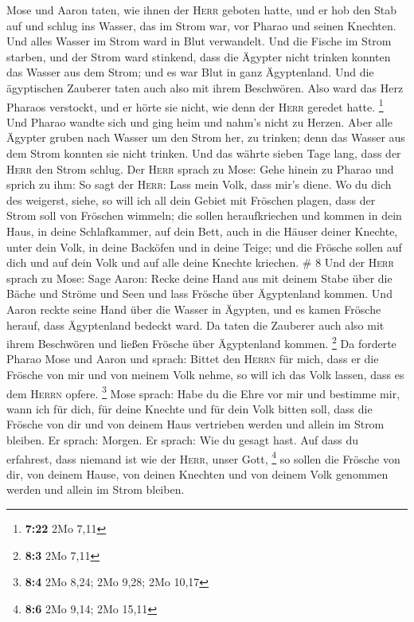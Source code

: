  Mose und Aaron taten, wie ihnen der \textsc{Herr}
geboten hatte, und er hob den Stab auf und schlug ins Wasser, das im
Strom war, vor Pharao und seinen Knechten. Und alles Wasser im Strom
ward in Blut verwandelt.  Und die Fische im Strom
starben, und der Strom ward stinkend, dass die Ägypter nicht trinken
konnten das Wasser aus dem Strom; und es war Blut in ganz Ägyptenland.
 Und die ägyptischen Zauberer taten auch also mit ihrem
Beschwören. Also ward das Herz Pharaos verstockt, und er hörte sie
nicht, wie denn der \textsc{Herr} geredet hatte. \footnote{\textbf{7:22}
  2Mo 7,11}  Und Pharao wandte sich und ging heim und
nahm's nicht zu Herzen.  Aber alle Ägypter gruben nach
Wasser um den Strom her, zu trinken; denn das Wasser aus dem Strom
konnten sie nicht trinken.  Und das währte sieben Tage
lang, dass der \textsc{Herr} den Strom schlug.  Der
\textsc{Herr} sprach zu Mose: Gehe hinein zu Pharao und sprich zu ihm:
So sagt der \textsc{Herr}: Lass mein Volk, dass mir's diene.
 Wo du dich des weigerst, siehe, so will ich all dein
Gebiet mit Fröschen plagen,  dass der Strom soll von
Fröschen wimmeln; die sollen heraufkriechen und kommen in dein Haus, in
deine Schlafkammer, auf dein Bett, auch in die Häuser deiner Knechte,
unter dein Volk, in deine Backöfen und in deine Teige; 
und die Frösche sollen auf dich und auf dein Volk und auf alle deine
Knechte kriechen. \# 8  Und der \textsc{Herr} sprach zu
Mose: Sage Aaron: Recke deine Hand aus mit deinem Stabe über die Bäche
und Ströme und Seen und lass Frösche über Ägyptenland kommen.
 Und Aaron reckte seine Hand über die Wasser in Ägypten,
und es kamen Frösche herauf, dass Ägyptenland bedeckt ward.
 Da taten die Zauberer auch also mit ihrem Beschwören und
ließen Frösche über Ägyptenland kommen. \footnote{\textbf{8:3} 2Mo 7,11}
 Da forderte Pharao Mose und Aaron und sprach: Bittet den
\textsc{Herrn} für mich, dass er die Frösche von mir und von meinem Volk
nehme, so will ich das Volk lassen, dass es dem \textsc{Herrn} opfere.
\footnote{\textbf{8:4} 2Mo 8,24; 2Mo 9,28; 2Mo 10,17} 
Mose sprach: Habe du die Ehre vor mir und bestimme mir, wann ich für
dich, für deine Knechte und für dein Volk bitten soll, dass die Frösche
von dir und von deinem Haus vertrieben werden und allein im Strom
bleiben.  Er sprach: Morgen. Er sprach: Wie du gesagt
hast. Auf dass du erfahrest, dass niemand ist wie der \textsc{Herr},
unser Gott, \footnote{\textbf{8:6} 2Mo 9,14; 2Mo 15,11} 
so sollen die Frösche von dir, von deinem Hause, von deinen Knechten und
von deinem Volk genommen werden und allein im Strom bleiben.

